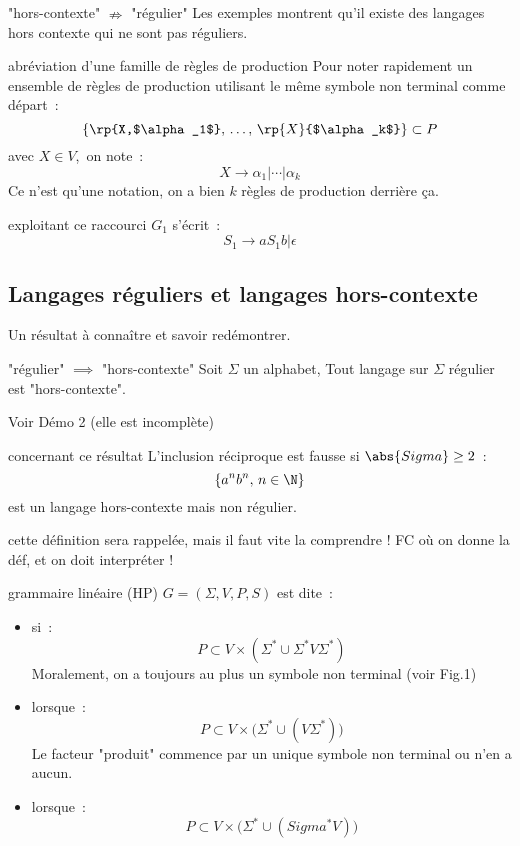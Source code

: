 \begin{adjustwidth}{-3cm}{-3cm}
{\begin{remarque}{}{"hors-contexte" $\nRightarrow$ "régulier"}
    Les exemples montrent qu'il existe des langages hors contexte qui ne sont pas réguliers.
\end{remarque}

\begin{remarque}{}{abréviation d'une famille de règles de production}
    Pour noter rapidement un ensemble de règles de production utilisant le même symbole non terminal comme départ~:
    $$\{\rp{X,$\alpha_1$},\, \dots,\, \rp{X}{$\alpha_k$}\} \subset P$$
    avec $X\in V$,\, on note~:
    $$X \rightarrow \alpha_1 \vert \cdots \vert \alpha_k$$
    Ce n'est qu'une notation, on a bien $k$ règles de production derrière ça.
\end{remarque}

\begin{exemple}{}{exploitant ce raccourci}
    $G_1$ s'écrit~:
    $$S_1 \rightarrow aS_1b \vert \epsilon$$
\end{exemple}

\subsection{Langages réguliers et langages hors-contexte}

Un résultat à connaître et savoir redémontrer.
\begin{proposition}{}{"régulier" $\implies$ "hors-contexte"}
    Soit $\Sigma$ un alphabet, Tout langage sur $\Sigma$ régulier est "hors-contexte".
\end{proposition}
Voir Démo 2 (elle est incomplète)

\begin{remarque}{}{concernant ce résultat}
    L'inclusion réciproque est fausse si $\abs{Sigma} \geq 2$~:
    $$\{a^nb^n,\, n \in \N\}$$
    est un langage hors-contexte mais non régulier.
\end{remarque}

cette définition sera rappelée, mais il faut vite la comprendre ! FC où on donne la déf, et on doit interpréter !
\begin{definition}{}{grammaire linéaire (HP)}
    $G = (\Sigma, V, P, S)$ est dite~:
    \begin{itemize}
        \item {} si~:
        $$P \subset V \times (\Sigma^* \cup \Sigma^*V\Sigma^*)$$
        Moralement, on a toujours au plus un symbole non terminal (voir Fig.1)
        \item {} lorsque~:
        $$P \subset V \times \bigg( \Sigma^* \cup (V \Sigma^*) \bigg)$$
        Le facteur "produit" commence par un unique symbole non terminal ou n'en a aucun.
        \item {} lorsque~:
        $$P \subset V \times \bigg( \Sigma^* \cup (Sigma^*V) \bigg)$$
    \end{itemize}
\end{definition}

}
\end{adjustwidth}
